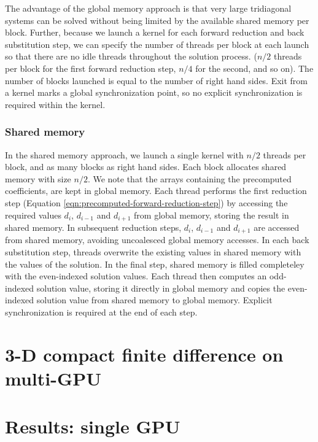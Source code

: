 \documentclass{elsarticle}
\begin{document}
The advantage of the global memory approach is that
very large tridiagonal systems can be solved without
being limited by the available shared memory per block.
Further,
because we launch a kernel for each
forward reduction and back substitution step,
we can specify the number of threads per block at each launch so that
there are no idle threads throughout the solution process.
($n/2$ threads per block for the first forward reduction step,
$n/4$ for the second, and so on).
The number of blocks launched is equal to the number of right
hand sides.
Exit from a kernel marks a global synchronization point,
so no explicit synchronization is required within the kernel.

\subsubsection*{Shared memory}

In the shared memory approach,
we launch a single kernel with $n/2$ threads per block,
and as many blocks as right hand sides.
Each block allocates shared memory with size $n/2$.
We note that the arrays containing the precomputed coefficients,
are kept in global memory.
Each thread performs the first reduction step
(Equation \ref{eqn:precomputed-forward-reduction-step})
by accessing the required values
$d_i$, $d_{i-1}$ and $d_{i+1}$ from global memory,
storing the result in shared memory.
In subsequent reduction steps,
$d_i$, $d_{i-1}$ and $d_{i+1}$
are accessed from shared memory,
avoiding uncoalesced global memory accesses.
In each back substitution step,
threads overwrite the existing values in shared memory
with the values of the solution.
In the final step,
shared memory is filled completeley
with the even-indexed solution values.
Each thread then computes an odd-indexed solution value,
storing it directly in global memory
and copies the even-indexed solution value
from shared memory to global memory.
Explicit synchronization is required at the end of each step.

\section{3-D compact finite difference on multi-GPU}

\section{Results: single GPU} \label{sec:results-single-gpu}
\end{document}
